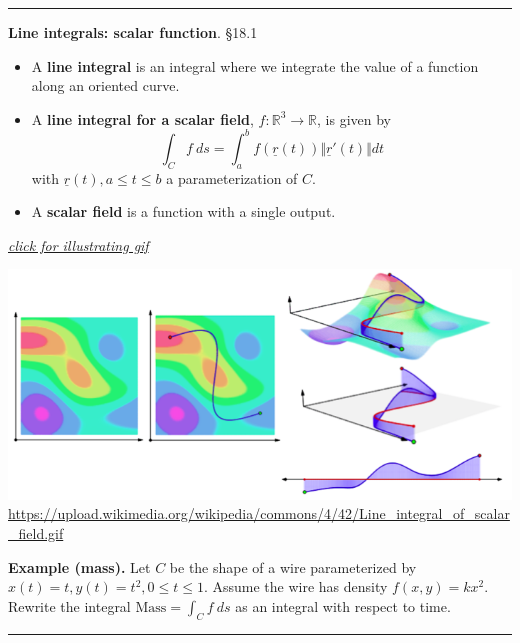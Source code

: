 \documentclass[12pt,letterpaper,noanswers]{exam}
\newcommand{\mb}[1]{\underline{#1}}
\begin{document}
\vspace{0.2cm}
\hrule
\vspace{0.2cm}

\noindent\textbf{Line integrals: scalar function}.  \S 18.1  

\begin{tcolorbox}
\begin{itemize}
\itemsep0em
    \item A \textbf{line integral} is an integral where we integrate the value of a function along an oriented curve.
    \item A \textbf{line integral for a scalar field}, $f:\mathbb{R}^3 \rightarrow \mathbb{R}$, is given by \[\int_C f\ ds = \int_a^b f(\mb r(t)) \Vert \mb r'(t)\Vert dt\] with $\mb r(t), a\leq t\leq b$ a parameterization of $C$.
    \item A \textbf{scalar field} is a function with a single output.
\end{itemize}
\end{tcolorbox}


\href{https://upload.wikimedia.org/wikipedia/commons/4/42/Line_integral_of_scalar_field.gif}{\emph{click for illustrating gif}}


\includegraphics[width=\linewidth]{img/C25p1-18.png}
\url{https://upload.wikimedia.org/wikipedia/commons/4/42/Line_integral_of_scalar_field.gif}




\noindent\textbf{Example (mass).} 
Let $C$ be the shape of a wire parameterized by $x(t) = t, y(t) = t^2, 0\leq t\leq 1$.  Assume the wire has density $f(x,y) = k x^2$.  Rewrite the integral $\displaystyle\text{Mass} = \int_C f \ ds$ as an integral with respect to time.

\vfill


\vspace{0.2cm}
\hrule
\vspace{0.2cm}
\end{document}
